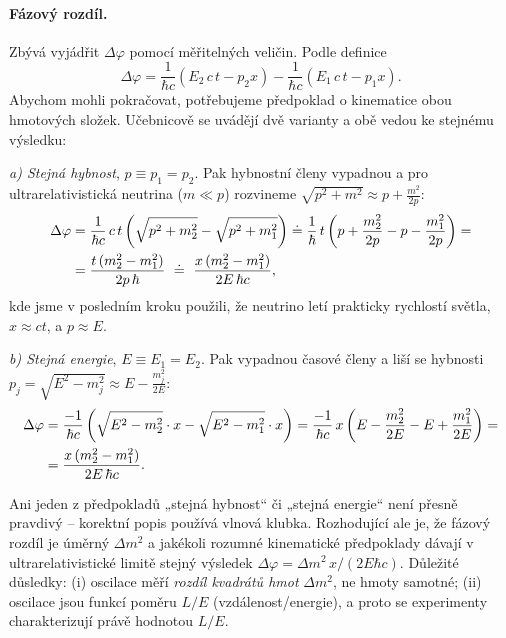 \paragraph{Fázový rozdíl.} Zbývá vyjádřit \(\Delta\varphi\) pomocí měřitelných veličin. Podle definice
\begin{equation}
  \Delta\varphi=\frac{1}{\hbar c}\left(E_2\,c\,t-p_2x\right)-\frac{1}{\hbar c}\left(E_1\,c\,t-p_1x\right).
\end{equation}
Abychom mohli pokračovat, potřebujeme předpoklad o kinematice obou hmotových složek. Učebnicově se uvádějí dvě varianty a obě vedou ke stejnému výsledku:

\emph{a) Stejná hybnost}, \(p\equiv p_1=p_2\). Pak hybnostní členy vypadnou a pro ultrarelativistická neutrina (\(m\ll p\)) rozvineme \(\sqrt{p^2+m^2}\approx p+\frac{m^2}{2p}\):
\begin{align}
  \Delta\varphi&=\frac{1}{\hbar c}\,c\,t\left(\sqrt{p^2+m_2^2}-\sqrt{p^2+m_1^2}\right)
  \doteq\frac{1}{\hbar}\,t\left(p+\frac{m_2^2}{2p}-p-\frac{m_1^2}{2p}\right)=\notag\\
  &=\frac{t\,(m_2^2-m_1^2)}{2p\,\hbar}\ \doteq\ \frac{x\,(m_2^2-m_1^2)}{2E\,\hbar c},
\end{align}
kde jsme v posledním kroku použili, že neutrino letí prakticky rychlostí světla, \(x\approx ct\), a \(p\approx E\).

\emph{b) Stejná energie}, \(E\equiv E_1=E_2\). Pak vypadnou časové členy a liší se hybnosti \(p_j=\sqrt{E^2-m_j^2}\approx E-\frac{m_j^2}{2E}\):
\begin{align}
  \Delta\varphi&=\frac{-1}{\hbar c}\left(\sqrt{E^2-m_2^2}\cdot x-\sqrt{E^2-m_1^2}\cdot x\right)
  =\frac{-1}{\hbar c}\,x\left(E-\frac{m_2^2}{2E}-E+\frac{m_1^2}{2E}\right)=\notag\\
  &=\frac{x\,(m_2^2-m_1^2)}{2E\,\hbar c}.
\end{align}

\begin{vysvetleni}
Ani jeden z předpokladů „stejná hybnost“ či „stejná energie“ není přesně pravdivý -- korektní popis používá vlnová klubka. Rozhodující ale je, že fázový rozdíl je úměrný \(\Delta m^2\) a jakékoli rozumné kinematické předpoklady dávají v ultrarelativistické limitě stejný výsledek \(\Delta\varphi=\Delta m^2\,x/(2E\hbar c)\). Důležité důsledky: (i) oscilace měří \emph{rozdíl kvadrátů hmot} \(\Delta m^2\), ne hmoty samotné; (ii) oscilace jsou funkcí poměru \(L/E\) (vzdálenost/energie), a proto se experimenty charakterizují právě hodnotou \(L/E\).
\end{vysvetleni}

